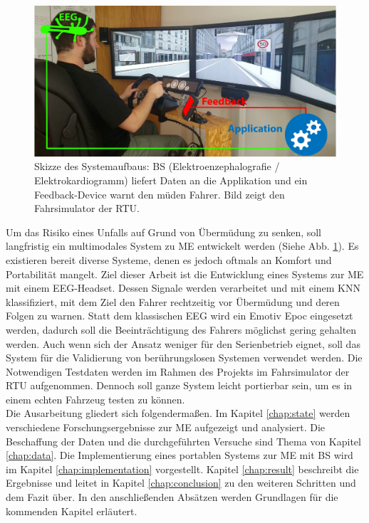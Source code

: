 {\begin{figure} 
  \begin{center}
    \includegraphics[width=12cm]{aufbau}
    \caption{Skizze des Systemaufbaus: \acl{BS} (Elektroenzephalografie / Elektrokardiogramm) liefert Daten an die Applikation und ein Feedback-Device warnt den müden Fahrer. Bild zeigt den Fahrsimulator der \acl{RTU}.}
    \label{fig:sketch}
  \end{center}
\end{figure}

Um das Risiko eines Unfalls auf Grund von Übermüdung zu senken, soll langfristig ein multimodales System zu \acl{ME} entwickelt werden (Siehe Abb. \ref{fig:sketch}). Es existieren bereit diverse Systeme, denen es jedoch oftmals an Komfort und Portabilität mangelt. Ziel dieser Arbeit ist die Entwicklung eines Systems zur \acl{ME} mit einem EEG-Headset. 
Dessen Signale werden verarbeitet und mit einem KNN klassifiziert, mit dem Ziel den Fahrer rechtzeitig vor Übermüdung und deren Folgen zu warnen.
Statt dem klassischen EEG wird ein Emotiv Epoc eingesetzt werden, dadurch  soll die Beeinträchtigung des Fahrers möglichst gering gehalten
werden. Auch wenn sich der Ansatz weniger für den Serienbetrieb eignet, soll das System für die Validierung von berührungslosen Systemen verwendet werden. Die Notwendigen Testdaten werden im Rahmen des Projekts im Fahrsimulator der \acl{RTU} aufgenommen. Dennoch soll ganze System leicht portierbar sein, um es in einem echten Fahrzeug testen zu können.
\\ 

Die Ausarbeitung gliedert sich folgendermaßen. Im Kapitel \ref{chap:state} werden verschiedene Forschungsergebnisse zur \acl{ME} aufgezeigt und analysiert. Die Beschaffung der Daten und die durchgeführten Versuche sind  Thema von Kapitel \ref{chap:data}. Die Implementierung eines portablen Systems zur \acl{ME} mit \acl{BS} wird im Kapitel \ref{chap:implementation} vorgestellt. Kapitel \ref{chap:result} beschreibt die Ergebnisse und leitet in Kapitel \ref{chap:conclusion} zu den weiteren Schritten und dem Fazit über. In den anschließenden Absätzen werden Grundlagen für die kommenden Kapitel erläutert.

}
